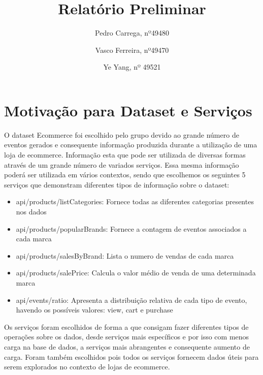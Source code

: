 \documentclass[11pt,a4paper]{article}
\begin{document}
\title{Relatório Preliminar}
\author{Pedro Carrega, nº49480 \and
Vasco Ferreira, nº49470 \and Ye Yang, nº 49521
}


\maketitle

\renewcommand*\contentsname{Indíce}
\tableofcontents
\newpage

\section{Motivação para Dataset e Serviços}

O dataset Ecommerce foi escolhido pelo grupo devido ao grande número de eventos gerados e consequente informação produzida durante a utilização de uma loja de ecommerce. Informação esta que pode ser utilizada de diversas formas através de um grande número de variados serviços. Essa mesma informação poderá ser utilizada em vários contextos, sendo que escolhemos os seguintes 5 serviços que demonstram diferentes tipos de informação sobre o dataset:

\begin{itemize}
  \item api/products/listCategories: Fornece todas as diferentes categorias presentes nos dados
  \item api/products/popularBrands: Fornece a contagem de eventos associados a cada marca
  \item api/products/salesByBrand: Lista o numero de vendas de cada marca
  \item api/products/salePrice: Calcula o valor médio de venda de uma determinada marca
  \item api/events/ratio: Apresenta a distribuição relativa de cada tipo de evento, havendo os possíveis valores: view, cart e purchase
\end{itemize}

Os serviços foram escolhidos de forma a que consigam fazer diferentes tipos de operações sobre os dados, desde serviços mais específicos e por isso com menos carga na base de dados, a serviços mais abrangentes e consequente aumento de carga. Foram também escolhidos pois todos os serviços fornecem dados úteis para serem explorados no contexto de lojas de ecommerce.
\end{document}
